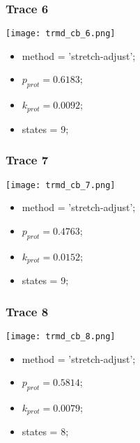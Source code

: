 \subsubsection{Trace 6}
\begin{minipage}[c]{0.7\textwidth}
	\texttt{[image: trmd\_cb\_6.png]}
\end{minipage}
\hfill
\begin{minipage}[c]{0.45\textwidth}
	\begin{itemize}
		\item method = 'stretch-adjust';
		\item $p_{prot}=0.6183$;
		\item $k_{prot}=0.0092$;
		\item states = 9;
	\end{itemize}
\end{minipage}

\subsubsection{Trace 7}
\begin{minipage}[c]{0.7\textwidth}
	\texttt{[image: trmd\_cb\_7.png]}
\end{minipage}
\hfill
\begin{minipage}[c]{0.45\textwidth}
	\begin{itemize}
		\item method = 'stretch-adjust';
		\item $p_{prot}=0.4763$;
		\item $k_{prot}=0.0152$;
		\item states = 9;
	\end{itemize}
\end{minipage}

\subsubsection{Trace 8}
\begin{minipage}[c]{0.7\textwidth}
	\texttt{[image: trmd\_cb\_8.png]}
\end{minipage}
\hfill
\begin{minipage}[c]{0.45\textwidth}
	\begin{itemize}
		\item method = 'stretch-adjust';
		\item $p_{prot}=0.5814$;
		\item $k_{prot}=0.0079$;
		\item states = 8;
	\end{itemize}
\end{minipage}

